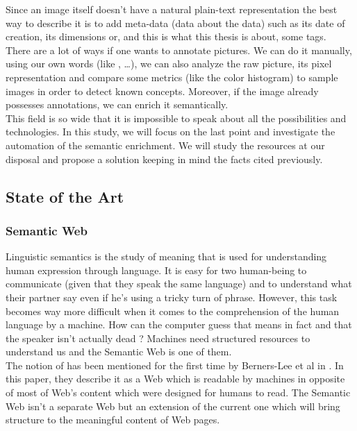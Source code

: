 Since an image itself doesn't have a natural plain-text representation the best way to describe it is to add meta-data (data about the data) such as its date of creation, its dimensions or, and this is what this thesis is about, some tags.\\

There are a lot of ways if one wants to annotate pictures. We can do it manually, using our own words (like ,  \dots), we can also analyze the raw picture, its pixel representation and compare some metrics (like the color histogram) to sample images in order to detect known concepts. Moreover, if the image already possesses annotations, we can enrich it semantically. \\

This field is so wide that it is impossible to speak about all the possibilities and technologies. In this study, we will focus on the last point and investigate the automation of the semantic enrichment. We will study the resources at our disposal and propose a solution keeping in mind the facts cited previously.\\

\subsection{State of the Art} %
\label{sub:state_of_the_art}

\subsubsection{Semantic Web} %
\label{ssub:semantic_web}
Linguistic semantics is the study of meaning that is used for understanding human expression through language. It is easy for two human-being to communicate (given that they speak the same language) and to understand what their partner say even if he's using a tricky turn of phrase. However, this task becomes way more difficult when it comes to the comprehension of the human language by a machine. How can the computer guess that  means in fact  and that the speaker isn't actually dead ? Machines need structured resources to understand us and the Semantic Web is one of them.\\

The notion of  has been mentioned for the first time by Berners-Lee et al in \cite{berners}. In this paper, they describe it as a Web which is readable by machines in opposite of most of Web's content which were designed for humans to read. The Semantic Web isn't a separate Web but an extension of the current one which will bring structure to the meaningful content of Web pages.\\

